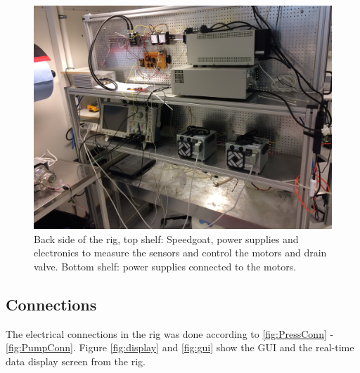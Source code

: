 \begin{figure}[H]
    \centering
    \includegraphics[width=1\textwidth]{back}
    \caption{Back side of the rig, top shelf: Speedgoat, power supplies and electronics to measure the sensors and control the motors and drain valve. Bottom shelf: power supplies connected to the motors.}
    \label{fig:back}
\end{figure}
\newpage
\subsection{Connections}
The electrical connections in the rig was done according to \ref{fig:PressConn} - \ref{fig:PumpConn}. Figure \ref{fig:display} and \ref{fig:gui} show the GUI and the real-time data display screen from the rig.  


